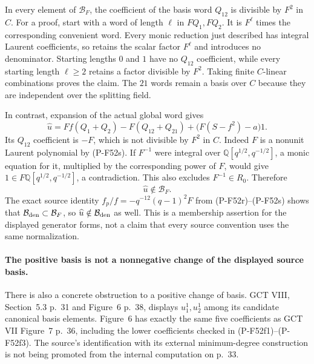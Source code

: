 In every element of $\mathcal B_F$, the coefficient of
the basis word $Q_{12}$ is divisible by $F^2$ in $C$.
For a proof, start with a word of length $\ell$ in
$FQ_1,FQ_2$. It is $F^\ell$ times the corresponding
convenient word. Every monic reduction just described has
integral Laurent coefficients, so retains the scalar factor
$F^\ell$ and introduces no denominator. Starting lengths
$0$ and $1$ have no $Q_{12}$ coefficient, while every
starting length $\ell\ge2$ retains a factor divisible by
$F^2$. Taking finite $C$-linear combinations proves the
claim. The $21$ words remain a basis over $C$ because
they are independent over the splitting field.

In contrast, expansion of the actual global word gives
\[
 \widehat u
    =Ff(Q_1+Q_2)-F(Q_{12}+Q_{21})
                      +\bigl(F(S-f^2)-a\bigr)1.
                                                               \tag{P-F52aq}
\]
Its $Q_{12}$ coefficient is $-F$, which is not divisible
by $F^2$ in $C$. Indeed $F$ is a nonunit Laurent polynomial
by (P-F52s). If $F^{-1}$ were integral over
$\mathbb Q[q^{1/2},q^{-1/2}]$, a monic equation for it,
multiplied by the corresponding power of $F$, would give
$1\in F\mathbb Q[q^{1/2},q^{-1/2}]$, a contradiction.
This also excludes $F^{-1}\in R_0$.
Therefore
\[
                  \widehat u\notin\mathcal B_F.
                                                               \tag{P-F52ar}
\]
The exact source identity
$f_p/f=-q^{-12}(q-1)^2F$ from (P-F52r)--(P-F52s)
shows that $\mathcal B_{\rm den}\subset\mathcal B_F$,
so $\widehat u\notin\mathcal B_{\rm den}$ as well.
This is a membership assertion for the displayed generator
forms, not a claim that every source convention uses the
same normalization.

\paragraph{The positive basis is not a nonnegative change of the displayed source basis.}
There is also a concrete obstruction to a positive change
of basis. GCT VIII, Section~5.3 p.~31 and Figure~6 p.~38,
displays $u_1^1,u_2^1$ among its candidate canonical basis
elements. Figure~6 has exactly the same five coefficients
as GCT VII Figure~7 p.~36, including the lower coefficients
checked in (P-F52f1)--(P-F52f3). The source's identification
with its external minimum-degree construction is not
being promoted from the internal computation on p.~33.

